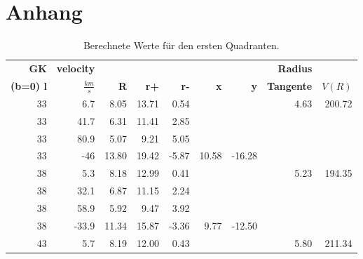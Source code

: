 

\newpage
\listoffigures
\listoftables
{}
\section*{Anhang}
\setcounter{section}{6}
\newpage
\begin{table}[H]
    \centering
    \caption{Berechnete Werte für den ersten Quadranten.}
\begin{tabular}{|r|r|r|r|r|r|r|r|r|}
\hline
    {\textbf{GK}} & {\textbf{velocity}} & {} &   {} &   {} &    {} &    {} & {\textbf{Radius}} & {} \\
    {\textbf{(b=0) l}} & {\textbf{$\si{}{\frac{km}{s}}$}}& {\textbf{R}} &   {\textbf{r+}} &   {\textbf{r-}} &    {\textbf{x} }&    {\textbf{y}} & {\textbf{Tangente}} & {\textbf{$V(R)$}} \\
    \hline
            33 &        6.7 &       8.05 &      13.71 &       0.54 &            &            &       4.63 &     200.72 \\
    
            33 &       41.7 &       6.31 &      11.41 &       2.85 &            &            &            &            \\
    
            33 &       80.9 &       5.07 &       9.21 &       5.05 &            &            &            &            \\
    
            33 &        -46 &      13.80 &      19.42 &      -5.87 &      10.58 &     -16.28 &            &            \\
    \hline
            38 &        5.3 &       8.18 &      12.99 &       0.41 &            &            &       5.23 &     194.35 \\
    
            38 &       32.1 &       6.87 &      11.15 &       2.24 &            &            &            &            \\
    
            38 &       58.9 &       5.92 &       9.47 &       3.92 &            &            &            &            \\
    
            38 &      -33.9 &      11.34 &      15.87 &      -3.36 &       9.77 &     -12.50 &            &            \\
    \hline
            43 &        5.7 &       8.19 &      12.00 &       0.43 &            &            &       5.80 &     211.34 \\
    

\end{tabular}
\end{table}
